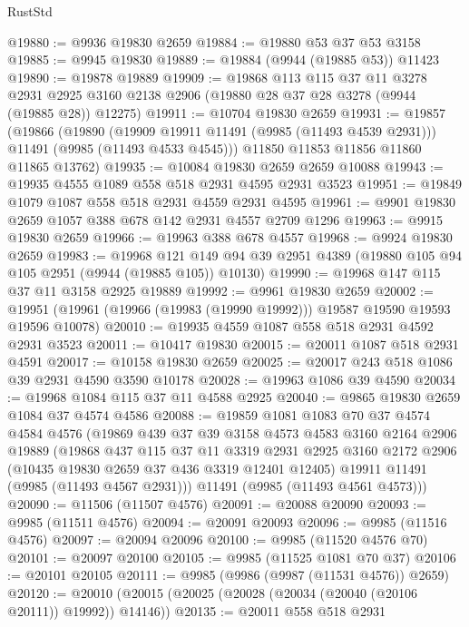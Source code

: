 \begin{lexlean}{RustStd}
\begin{coremodule}
@19880 := @9936 @19830 @2659
@19884 := @19880 @53 @37 @53 @3158
@19885 := @9945 @19830
@19889 := @19884 (@9944 (@19885 @53)) @11423
@19890 := @19878 @19889
@19909 := @19868
    @113
    @115
    @37
    @11
    @3278
    @2931
    @2925
    @3160
    @2138
    @2906
    (@19880 @28 @37 @28 @3278 (@9944 (@19885 @28)) @12275)
@19911 := @10704 @19830 @2659
@19931 := @19857
    (@19866
      (@19890
        (@19909 @19911 @11491 (@9985 (@11493 @4539 @2931)))
        @11491
        (@9985 (@11493 @4533 @4545)))
      @11850
      @11853
      @11856
      @11860
      @11865
      @13762)
@19935 := @10084 @19830 @2659 @2659 @10088
@19943 := @19935 @4555 @1089 @558 @518 @2931 @4595 @2931 @3523
@19951 := @19849 @1079 @1087 @558 @518 @2931 @4559 @2931 @4595
@19961 := @9901 @19830 @2659 @1057 @388 @678 @142 @2931 @4557 @2709 @1296
@19963 := @9915 @19830 @2659
@19966 := @19963 @388 @678 @4557
@19968 := @9924 @19830 @2659
@19983 := @19968
    @121
    @149
    @94
    @39
    @2951
    @4389
    (@19880 @105 @94 @105 @2951 (@9944 (@19885 @105)) @10130)
@19990 := @19968 @147 @115 @37 @11 @3158 @2925 @19889
@19992 := @9961 @19830 @2659
@20002 := @19951 (@19961 (@19966 (@19983 (@19990 @19992))) @19587 @19590 @19593 @19596 @10078)
@20010 := @19935 @4559 @1087 @558 @518 @2931 @4592 @2931 @3523
@20011 := @10417 @19830
@20015 := @20011 @1087 @518 @2931 @4591
@20017 := @10158 @19830 @2659
@20025 := @20017 @243 @518 @1086 @39 @2931 @4590 @3590 @10178
@20028 := @19963 @1086 @39 @4590
@20034 := @19968 @1084 @115 @37 @11 @4588 @2925
@20040 := @9865 @19830 @2659 @1084 @37 @4574 @4586
@20088 := @19859
    @1081
    @1083
    @70
    @37
    @4574
    @4584
    @4576
    (@19869
      @439
      @37
      @39
      @3158
      @4573
      @4583
      @3160
      @2164
      @2906
      @19889
      (@19868
        @437
        @115
        @37
        @11
        @3319
        @2931
        @2925
        @3160
        @2172
        @2906
        (@10435 @19830 @2659 @37 @436 @3319 @12401 @12405)
        @19911
        @11491
        (@9985 (@11493 @4567 @2931)))
      @11491
      (@9985 (@11493 @4561 @4573)))
@20090 := @11506 (@11507 @4576)
@20091 := @20088 @20090
@20093 := @9985 (@11511 @4576)
@20094 := @20091 @20093
@20096 := @9985 (@11516 @4576)
@20097 := @20094 @20096
@20100 := @9985 (@11520 @4576 @70)
@20101 := @20097 @20100
@20105 := @9985 (@11525 @1081 @70 @37)
@20106 := @20101 @20105
@20111 := @9985 (@9986 (@9987 (@11531 @4576)) @2659)
@20120 := @20010 (@20015 (@20025 (@20028 (@20034 (@20040 (@20106 @20111)) @19992)) @14146))
@20135 := @20011
    @558
    @518
    @2931

\end{coremodule}
\end{lexlean}

